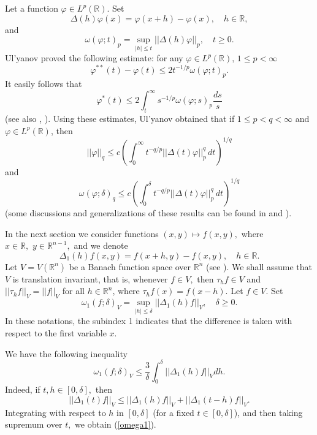 \documentclass[12pt,twoside,reqno]{amsart}
\numberwithin{equation}{section}
\theoremstyle{definition}
\numberwithin{equation}{section}
\def\o{\omega}
\def\R{\mathbb{R}}
\def\d{\delta}
\def\f{\varphi}
\begin{document}
Let a function $\f\in L^p(\R)$. Set
\begin{equation}\label{one}
\Delta(h)\f(x)=\f(x+h)-\f(x), \quad h\in \R,
\end{equation}
and
$$
\o(\f;t)_p=\sup_{|h|\le t}||\Delta(h)\f||_p, \quad t\ge 0.
$$
 Ul'yanov \cite{U} proved the following estimate: for any $\f\in L^p(\R),\,1\le p <\infty$
 $$
 \f^{**}(t)-\f(t)\le 2t^{-1/p}\o(\f;t)_p.
 $$
 It easily follows that
\begin{equation}\label{Ulyanov1}
\f^*(t)\le 2\int_t^\infty s^{-1/p}\o(\f;s)_p\frac{ds}{s}
\end{equation}
(see also \cite[p. 149]{K98}, \cite{Stor}).
Using these estimates, Ul'yanov obtained that if $1\le p <q<\infty$ and  $\f\in L^p(\R)$, then
\begin{equation}\label{Ulyanov2}
||\f||_q\le c \left(\int_0^\infty t^{-q/p}||\Delta(t)\f||_p^q\,dt\right)^{1/q}
\end{equation}
and
\begin{equation}\label{Ulyanov3}
\o(\f;\d)_q\le c\left(\int_0^\d t^{-q/p}||\Delta(t)\f||_p^q\,dt\right)^{1/q}
\end{equation}
(some discussions and generalizations of these results can be found in    \cite{K98} and \cite{K07}).

In the next section we consider functions $(x,y)\mapsto f(x,y),$ where
 $x\in \R, \,\, y\in \R^{n-1},$ and we denote
\begin{equation}\label{several}
\Delta_1(h)f(x,y)=f(x+h,y)-f(x,y), \quad h\in \R.
\end{equation}
Let $V=V(\R^n)$ be a Banach function space over $\R^n$ (see \cite[Ch. 1]{BS}). We shall assume that $V$ is translation invariant, that is,
whenever $f\in V,$ then $\tau_h f\in V$ and $||\tau_h f||_V=||f||_V$ for all $h\in \R^n$, where
$\tau_h f(x)=f(x-h).$
Let $f\in V$. Set
$$
\o_1(f;\d)_V=\sup_{|h|\le \d}||\Delta_1(h)f||_V, \quad \d\ge 0.
$$
In these notations, the  subindex 1 indicates that the difference is taken with respect to the first variable $x.$

We have the following inequality
\begin{equation}\label{omega1}
\o_1(f;\delta)_V\le \frac{3}{\d}\int_0^\d ||\Delta_1(h)f||_Vdh.
\end{equation}
Indeed, if $t, h\in [0,\d],$ then
$$
||\Delta_1(t)f||_V\le ||\Delta_1(h)f||_V + ||\Delta_1(t-h)f||_V.
$$
Integrating with respect to $h$ in $[0,\d]$ (for a fixed $t\in [0,\d]$),  and then taking supremum over $t,$ we obtain (\ref{omega1}).
\end{document}
